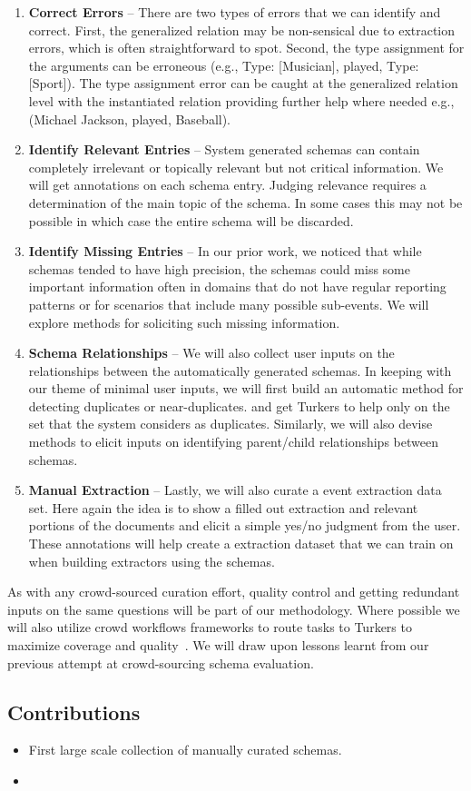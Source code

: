 \begin{enumerate}
\item {\bf Correct Errors} -- There are two types of errors that we can identify and correct. First, the generalized relation may be non-sensical due to extraction errors, which is often straightforward to spot. Second, the type assignment for the arguments can be erroneous (e.g., Type: [Musician], played, Type: [Sport]). The type assignment error can be caught at the generalized relation level with the instantiated relation providing further help where needed e.g., (Michael Jackson, played, Baseball).
\item {\bf Identify Relevant Entries} -- System generated schemas can contain completely irrelevant or topically relevant but not critical information. We will get annotations on each schema entry. Judging relevance requires a determination of the main topic of the schema. In some cases this may not be possible in which case the entire schema will be discarded.
\item {\bf Identify Missing Entries} -- In our prior work, we noticed that while schemas tended to have high precision, the schemas could miss some important information often in domains that do not have regular reporting patterns or for scenarios that include many possible sub-events. We will explore methods for soliciting such missing information.
\item {\bf Schema Relationships} -- We will also collect user inputs on the relationships between the automatically generated schemas. In keeping with our theme of minimal user inputs, we will first build an automatic method for detecting duplicates or near-duplicates.  and get Turkers to help only on the set that the system considers as duplicates. Similarly, we will also devise methods to elicit inputs on identifying parent/child relationships between schemas.   
\item {\bf Manual Extraction} -- Lastly, we will also curate a event extraction data set. Here again the idea is to show a filled out extraction and relevant portions of the documents and elicit a simple yes/no judgment from the user. These annotations will help create a extraction dataset that we can train on when building extractors using the schemas.
\end{enumerate}

As with any crowd-sourced curation effort, quality control and getting redundant inputs on the same questions will be part of our methodology. Where possible we will also utilize crowd workflows frameworks to route tasks to Turkers to maximize coverage and quality~\cite{}. We will draw upon lessons learnt from our previous attempt at crowd-sourcing schema evaluation.

\subsection{Contributions}

\begin{itemize}
\item First large scale collection of manually curated schemas. 
\item 
\end{itemize}
